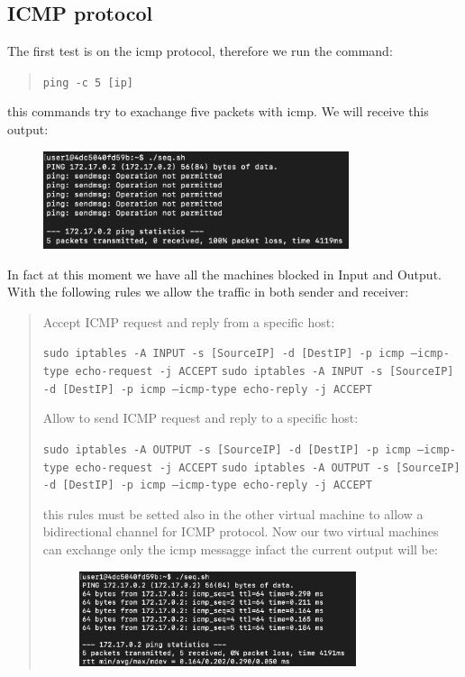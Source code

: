 \documentclass[11pt]{article}
\begin{document}
\subsection{ICMP protocol}
The first test is on the icmp protocol, therefore we run the command:

\begin{quote}
  \texttt{ping -c 5 [ip]}\newline
\end{quote}

this commands try to exachange five packets with icmp. We will receive this output:

\begin{figure}[!ht]
  \centering
  \includegraphics[width=0.8\textwidth]{pic3-hw8-1635747.png}
  \label{fig:conf}
\end{figure}

In fact at this moment we have all the machines blocked in Input and Output. With the following rules we allow the traffic in both sender and receiver:

\begin{quote}
  Accept ICMP request and reply from a specific host:

  \texttt{sudo iptables -A INPUT -s [SourceIP] -d [DestIP] -p icmp --icmp-type echo-request -j ACCEPT}\newline
  \texttt{sudo iptables -A INPUT -s [SourceIP] -d [DestIP] -p icmp --icmp-type echo-reply -j ACCEPT}\newline

  Allow to send ICMP request and reply to a specific host:

  \texttt{sudo iptables -A OUTPUT -s [SourceIP] -d [DestIP] -p icmp --icmp-type echo-request -j ACCEPT}\newline
  \texttt{sudo iptables -A OUTPUT -s [SourceIP] -d [DestIP] -p icmp --icmp-type echo-reply -j ACCEPT}\newline

  this rules must be setted also in the other virtual machine to allow a bidirectional channel for ICMP protocol. Now our two virtual machines can exchange only the icmp messagge infact the current output will be:

  \begin{figure}[!ht]
    \centering
    \includegraphics[width=0.8\textwidth]{pic4-hw8-1635747.png}
    \label{fig:conf}
  \end{figure}
\end{quote}
\end{document}
